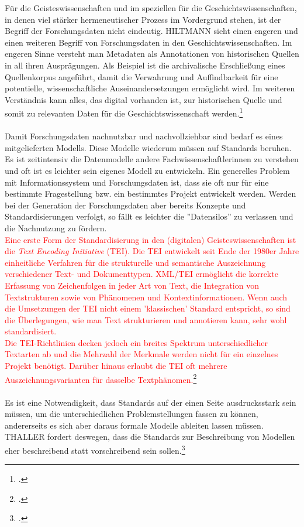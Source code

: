 \documentclass[12pt,a4paper]{article}
\begin{document}
Für die Geisteswissenschaften und im speziellen für die Geschichtswissenschaften, in denen viel stärker hermeneutischer Prozess im Vordergrund stehen, ist der Begriff der Forschungsdaten nicht eindeutig. HILTMANN sieht einen engeren und einen weiteren Begriff von Forschungsdaten in den Geschichtswissenschaften. Im engeren Sinne versteht man Metadaten als Annotationen von historischen Quellen in all ihren Ausprägungen. Als Beispiel ist die archivalische Erschließung eines Quellenkorpus angeführt, damit die Verwahrung und Auffindbarkeit für eine potentielle, wissenschaftliche Auseinandersetzungen ermöglicht wird. Im weiteren Verständnis kann alles, das digital vorhanden ist, zur historischen Quelle und somit zu relevanten Daten für die Geschichtswissenschaft werden.\footcite[][09.06.2019.]{hiltman2018forschungsdaten}
\\
\\
Damit Forschungsdaten nachnutzbar und nachvollziehbar sind bedarf es eines mitgelieferten Modells. Diese Modelle wiederum müssen auf Standards beruhen. Es ist zeitintensiv die Datenmodelle andere Fachwissenschaftlerinnen zu verstehen und oft ist es leichter sein eigenes Modell zu entwickeln. Ein generelles Problem mit Informationssystem und Forschungsdaten ist, dass sie oft nur für eine bestimmte Fragestellung bzw. ein bestimmtes Projekt entwickelt werden. Werden bei der Generation der Forschungsdaten aber bereits Konzepte und Standardisierungen verfolgt, so fällt es leichter die ''Datensilos'' zu verlassen und die Nachnutzung zu fördern. 
\\
\textcolor{red}{
Eine erste Form der Standardisierung in den (digitalen) Geisteswissenschaften ist die \textit{Text Encoding Initiative} (TEI). Die TEI entwickelt seit Ende der 1980er Jahre einheitliche Verfahren für die strukturelle und semantische Auszeichnung verschiedener Text- und Dokumenttypen. XML/TEI ermöglicht die korrekte Erfassung von Zeichenfolgen in jeder Art von Text, die Integration von Textstrukturen sowie von Phänomenen und Kontextinformationen. Wenn auch die Umsetzungen der TEI nicht einem 'klassischen' Standard entspricht, so sind die Überlegungen, wie man Text strukturieren und annotieren kann, sehr wohl standardisiert.
\\
Die TEI-Richtlinien decken jedoch ein breites Spektrum unterschiedlicher Textarten ab und die Mehrzahl der Merkmale werden nicht für ein einzelnes Projekt benötigt. Darüber hinaus erlaubt die TEI oft mehrere Auszeichnungsvarianten für dasselbe Textphänomen.\footcite[][S.234-249]{sahle2017dhedition}  
}
\\
\\
Es ist eine Notwendigkeit, dass Standards auf der einen Seite ausdrucksstark sein müssen, um die unterschiedlichen Problemstellungen fassen zu können, andererseits es sich aber daraus formale Modelle ableiten lassen müssen. THALLER fordert deswegen, dass die Standards zur Beschreibung von Modellen eher beschreibend statt vorschreibend sein sollen.\footcite[][S.204]{thaller2017need}
\end{document}
